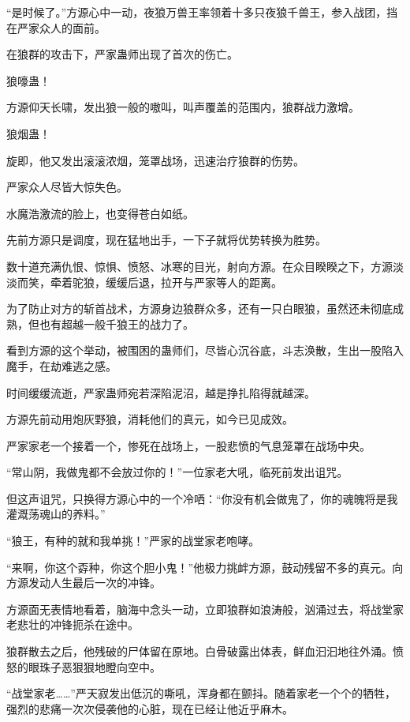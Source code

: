 
\begin{this_body}

“是时候了。”方源心中一动，夜狼万兽王率领着十多只夜狼千兽王，参入战团，挡在严家众人的面前。

在狼群的攻击下，严家蛊师出现了首次的伤亡。

狼嚎蛊！

方源仰天长啸，发出狼一般的嗷叫，叫声覆盖的范围内，狼群战力激增。

狼烟蛊！

旋即，他又发出滚滚浓烟，笼罩战场，迅速治疗狼群的伤势。

严家众人尽皆大惊失色。

水魔浩激流的脸上，也变得苍白如纸。

先前方源只是调度，现在猛地出手，一下子就将优势转换为胜势。

数十道充满仇恨、惊惧、愤怒、冰寒的目光，射向方源。在众目睽睽之下，方源淡淡而笑，牵着驼狼，缓缓后退，拉开与严家等人的距离。

为了防止对方的斩首战术，方源身边狼群众多，还有一只白眼狼，虽然还未彻底成熟，但也有超越一般千狼王的战力了。

看到方源的这个举动，被围困的蛊师们，尽皆心沉谷底，斗志涣散，生出一股陷入魔手，在劫难逃之感。

时间缓缓流逝，严家蛊师宛若深陷泥沼，越是挣扎陷得就越深。

方源先前动用炮灰野狼，消耗他们的真元，如今已见成效。

严家家老一个接着一个，惨死在战场上，一股悲愤的气息笼罩在战场中央。

“常山阴，我做鬼都不会放过你的！”一位家老大吼，临死前发出诅咒。

但这声诅咒，只换得方源心中的一个冷哂：“你没有机会做鬼了，你的魂魄将是我灌溉荡魂山的养料。”

“狼王，有种的就和我单挑！”严家的战堂家老咆哮。

“来啊，你这个孬种，你这个胆小鬼！”他极力挑衅方源，鼓动残留不多的真元。向方源发动人生最后一次的冲锋。

方源面无表情地看着，脑海中念头一动，立即狼群如浪涛般，汹涌过去，将战堂家老悲壮的冲锋扼杀在途中。

狼群散去之后，他残破的尸体留在原地。白骨破露出体表，鲜血汩汩地往外涌。愤怒的眼珠子恶狠狠地瞪向空中。

“战堂家老……”严天寂发出低沉的嘶吼，浑身都在颤抖。随着家老一个个的牺牲，强烈的悲痛一次次侵袭他的心脏，现在已经让他近乎麻木。


\end{this_body}
